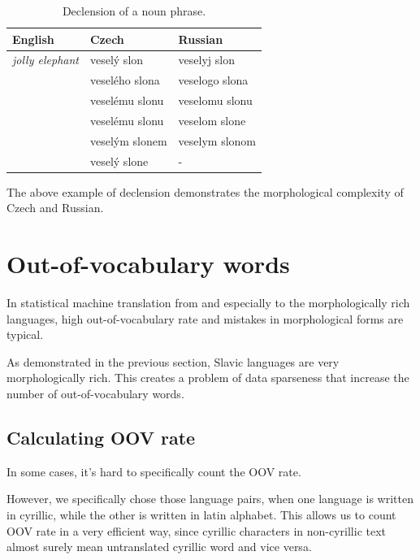 \documentclass[11pt,letterpaper]{article}
\begin{document}
\begin{table}
\begin{center}
\begin{tabular}{|l|l|l|}
\hline
English & Czech & Russian \\ \hline
\textit{jolly elephant} & veselý slon & veselyj slon \\
 & veselého slona & veselogo slona \\
 & veselému slonu & veselomu slonu \\
 & veselému slonu & veselom slone\\
 & veselým slonem& veselym slonom\\
 & veselý slone & - \\ %
\hline
\end{tabular}
\end{center}
\caption{Declension of a noun phrase.}
\label{tab:slon}
\end{table}

The above example of declension demonstrates the morphological complexity of Czech and Russian.

\section{Out-of-vocabulary words}
In statistical machine translation from and especially to the morphologically rich languages,
high out-of-vocabulary rate and mistakes in morphological forms are typical.

As demonstrated in the previous section, Slavic languages are very morphologically rich. This creates a problem of data sparseness that increase the number of out-of-vocabulary words.

\subsection{Calculating OOV rate}
In some cases, it's hard to specifically count the OOV rate.

However, we specifically chose those language pairs, when one language is written in cyrillic, while the other is written in latin alphabet. This allows us to count OOV rate in a very efficient way, since cyrillic characters in non-cyrillic text almost surely mean untranslated cyrillic word and vice versa.
\end{document}
